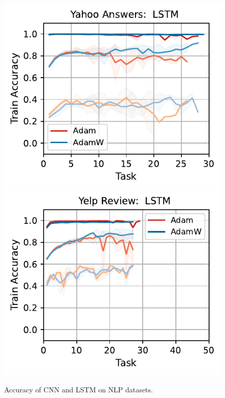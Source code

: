 \begin{figure}[htb!]
{    \includegraphics[width=\textwidth]{figs/Accuracy/nlp/lstm/yahoo_answers_50.pdf}
    \includegraphics[width=\textwidth]{figs/Accuracy/nlp/lstm/yelp_review_full_50.pdf}
    }
    \caption{Accuracy of CNN and LSTM on NLP datasets.}
    \label{fig:nlp_cnn_lstm}
\end{figure}

